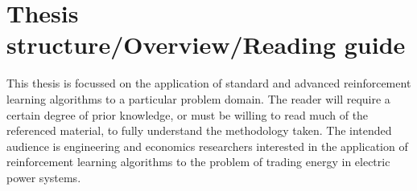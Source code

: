 \section{Thesis structure/Overview/Reading guide}
This thesis is focussed on the application of standard and advanced
reinforcement learning algorithms to a particular problem domain.  The reader
will require a certain degree of prior knowledge, or must be willing to read
much of the referenced material, to fully understand the methodology taken.
The intended audience is engineering and economics researchers interested in
the application of reinforcement learning algorithms to the problem of trading
energy in electric power systems.

%
%
%
%
%
%
%
%
%

